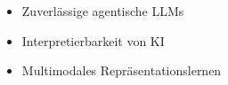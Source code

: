 \twocolumnsection
{
\begin{skills}
\end{skills}}
{
\vspace{1em}
\begin{itemize}
	\item Zuverlässige agentische LLMs
	\item Interpretierbarkeit von KI
	\item Multimodales Repräsentationslernen
\end{itemize}
}
